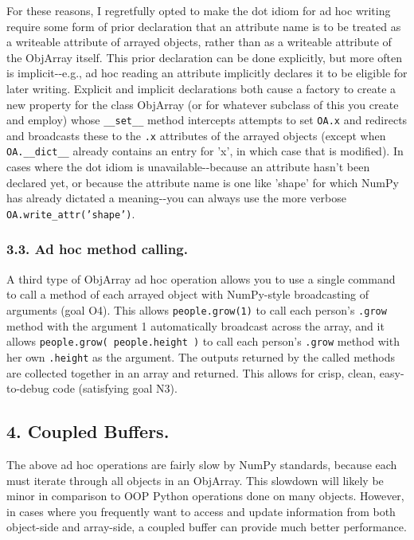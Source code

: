 \documentclass[letterpaper,compsoc,twoside]{IEEEtran}
\begin{document}
For these reasons, I regretfully opted to make the dot idiom for ad hoc writing require some form of prior declaration that an attribute name is to be treated as a writeable attribute of arrayed objects, rather than as a writeable attribute of the ObjArray itself.  This prior declaration can be done explicitly, but more often is implicit-{}-e.g., ad hoc reading an attribute implicitly declares it to be eligible for later writing.  Explicit and implicit declarations both cause a factory to create a new property for the class ObjArray (or for whatever subclass of this you create and employ) whose \texttt{\_\_set\_\_} method intercepts attempts to set \texttt{OA.x} and redirects and broadcasts these to the \texttt{.x} attributes of the arrayed objects (except when \texttt{OA.\_\_dict\_\_} already contains an entry for 'x', in which case that is modified).  In cases where the dot idiom is unavailable-{}-because an attribute hasn't been declared yet, or because the attribute name is one like 'shape' for which NumPy has already dictated a meaning-{}-you can always use the more verbose \texttt{OA.write\_attr('shape')}.

\subsubsection{3.3.  Ad hoc method calling.%
  \label{ad-hoc-method-calling}%
}


A third type of ObjArray ad hoc operation allows you to use a single command to call a method of each arrayed object with NumPy-style broadcasting of arguments (goal O4).  This allows \texttt{people.grow(1)} to call each person's \texttt{.grow} method with the argument 1 automatically broadcast across the array, and it allows \texttt{people.grow( people.height )} to call each person's \texttt{.grow} method with her own \texttt{.height} as the argument.  The outputs returned by the called methods are collected together in an array and returned.  This allows for crisp, clean, easy-to-debug code (satisfying goal N3).

\subsection{4.  Coupled Buffers.%
  \label{coupled-buffers}%
}


The above ad hoc operations are fairly slow by NumPy standards, because each must iterate through all objects in an ObjArray.  This slowdown will likely be minor in comparison to OOP Python operations done on many objects.  However, in cases where you frequently want to access and update information from both object-side and array-side, a coupled buffer can provide much better performance.
\end{document}
